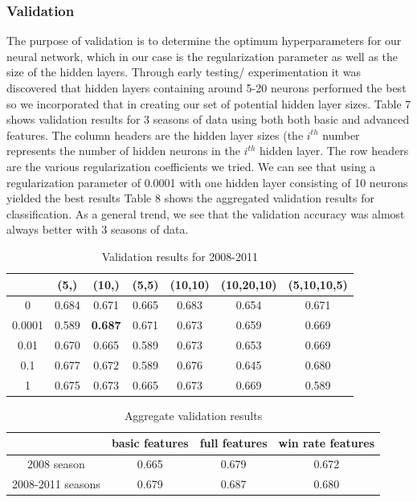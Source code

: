 \documentclass{article}
\begin{document}
\subsubsection{Validation}
The purpose of validation is to determine the optimum hyperparameters for our neural network, which in our case is the regularization parameter as well as the size of the hidden layers. Through early testing/ experimentation it was discovered that hidden layers containing around 5-20 neurons performed the best so we incorporated that in creating our set of potential hidden layer sizes. Table 7 shows validation results for 3 seasons of data using both both basic and advanced features. The column headers are the hidden layer sizes (the $i^{th}$ number represents the number of hidden neurons in the $i^{th}$ hidden layer. The row headers are the various regularization coefficients we tried. We can see that using a regularization parameter of 0.0001 with one hidden layer consisting of 10 neurons yielded the best results Table 8 shows the aggregated validation results for classification. As a general trend, we see that the validation accuracy was almost always better with 3 seasons of data. 

\begin{table}
  \begin{center}
    \begin{tabular}{ | c | c | c | c | c | c | c |}
      \hline
            &             	(5,) & 	(10,) & 	(5,5) &  	(10,10) & 	(10,20,10) & 	(5,10,10,5)  \\ \hline
	0  &     	0.684 & 	0.671&	0.665&	0.683&	0.654&		0.671	    \\ \hline
	0.0001 &   0.589 &     \textbf{0.687}&	0.671&	0.673&	0.659&		0.669	    \\ \hline
	0.01  &    	0.670 &     0.665&	0.589&	0.673&	0.653&		0.669	    \\ \hline
	0.1	&	0.677&	0.672&	0.589&	0.676&	0.645&		0.680	    \\ \hline
	1&		0.675&	0.673&	0.665&	0.673&	0.669&		0.589	    \\ \hline

    \end{tabular}
  \end{center}
  \caption{Validation results for 2008-2011}
\end{table}

\begin{table}
  \begin{center}
    \begin{tabular}{ | c | c | c | c |}
      \hline
            &            	basic features & 	full features &  win rate features  \\ \hline
	2008 season  &     	0.665 & 	0.679 & 0.672    \\ \hline
	2008-2011 seasons &   0.679&  0.687 & 0.680  \\ \hline	

	
    \end{tabular}
  \end{center}
  \caption{Aggregate validation results}
\end{table}
\end{document}
